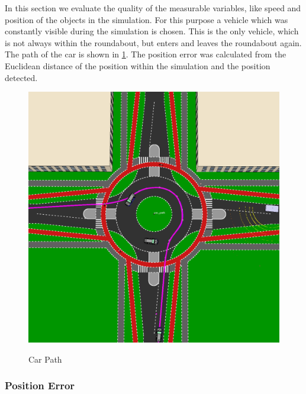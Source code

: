 \documentclass[11pt,oneside,openright]{mpreport}
\begin{document}
In this section we evaluate the quality of the measurable variables, like speed and position of the objects in the simulation.
For this purpose a vehicle which was constantly visible during the simulation is chosen.
This is the only vehicle, which is not always within the roundabout, but enters and leaves the roundabout again. 
The path of the car is shown in \cref{car_path1}. The position error was calculated from the Euclidean distance of the position within the simulation and the position detected.

\begin{figure}[!htb]
  \caption{Car Path} 
  \centering
  \includegraphics[width=\textwidth]{bilder/car_path.png}
 \label{car_path1}
\end{figure}

\subsubsection{Position Error}

\end{document}
